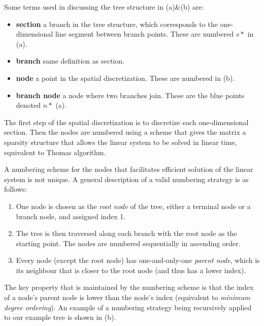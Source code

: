 Some terms used in discussing the tree structure in (a)\&(b) are:
\begin{itemize}
        \item \textbf{section} a branch in the tree structure, which corresponds to the one-dimensional line segment between branch points. These are numbered $s*$ in (a).
        \item \textbf{branch} same definition as section.
        \item \textbf{node} a point in the spatial discretization. These are numbered in (b).
        \item \textbf{branch node} a node where two branches join. These are the blue points denoted $n*$ (a).
\end{itemize}

The first step of the spatial discretization is to discretize each one-dimensional section. Then the nodes are numbered using a scheme that gives the matrix a sparsity structure that allows the linear system to be solved in linear time, equivalent to Thomas algorithm.

A numbering scheme for the nodes that facilitates efficient solution of the linear system is not unique. A general description of a valid numbering strategy is as follows:
\begin{enumerate}
    \item
        One node is chosen as the \emph{root node} of the tree, either a terminal node or a branch node, and assigned index 1.
    \item
        The tree is then traversed along each branch with the root node as the starting point. The nodes are numbered sequentially in ascending order.
    \item
        Every node (except the root node) has one-and-only-one \emph{parent node}, which is its neighbour that is closer to the root node (and thus has a lower index).
\end{enumerate}
The key property that is maintained by the numbering scheme is that the index of a node's parent node is lower than the node's index (equivalent to \emph{minimum degree ordering}). An example of a numbering strategy being recursively applied to our example tree is shown in (b).

